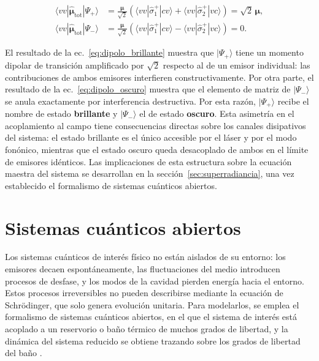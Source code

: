 \begin{align}
	\langle vv|\hat{\boldsymbol{\mu}}_\text{tot}|\Psi_+\rangle
	&= \frac{\boldsymbol{\mu}}{\sqrt{2}}\left(
	\langle vv|\hat{\sigma}_1^+|cv\rangle +
	\langle vv|\hat{\sigma}_2^+|vc\rangle
	\right) = \sqrt{2}\,\boldsymbol{\mu},
	\label{eq:dipolo_brillante}\\[4pt]
	\langle vv|\hat{\boldsymbol{\mu}}_\text{tot}|\Psi_-\rangle
	&= \frac{\boldsymbol{\mu}}{\sqrt{2}}\left(
	\langle vv|\hat{\sigma}_1^+|cv\rangle -
	\langle vv|\hat{\sigma}_2^+|vc\rangle
	\right) = 0.
	\label{eq:dipolo_oscuro}
\end{align}

El resultado de la ec.~\eqref{eq:dipolo_brillante} muestra que $|\Psi_+\rangle$ tiene un momento dipolar de transición amplificado por $\sqrt{2}$  respecto al de un emisor individual: las contribuciones de ambos emisores interfieren constructivamente. Por otra parte, el resultado de la ec.~\eqref{eq:dipolo_oscuro} muestra que el elemento de matriz de $|\Psi_-\rangle$ se anula exactamente por interferencia destructiva. Por esta razón, $|\Psi_+\rangle$ recibe el nombre de estado \textbf{brillante} y $|\Psi_-\rangle$ el de estado \textbf{oscuro}. Esta asimetría en el acoplamiento al campo tiene consecuencias directas sobre los canales disipativos del sistema: el estado brillante es el único accesible por el láser y por el modo fonónico, mientras que el estado oscuro queda desacoplado de ambos en el límite de emisores idénticos. Las implicaciones de esta estructura sobre la ecuación maestra del sistema se desarrollan en la sección~\ref{sec:superradiancia}, una vez establecido el formalismo de sistemas cuánticos abiertos.


\section{Sistemas cuánticos abiertos}
\label{sec:sistemas_abiertos}

Los sistemas cuánticos de interés físico no están aislados de su entorno: los emisores decaen espontáneamente, las fluctuaciones del medio introducen procesos de desfase, y los modos de la cavidad pierden energía hacia el entorno. Estos procesos irreversibles no pueden describirse mediante la ecuación de Schrödinger, que solo genera evolución unitaria. Para modelarlos, se emplea el formalismo de sistemas cuánticos abiertos, en el que el sistema de interés está acoplado a un reservorio o baño térmico de muchos grados de libertad, y la dinámica del sistema reducido se obtiene trazando sobre los grados de libertad del baño \cite{breuerpetruccione2002}.


